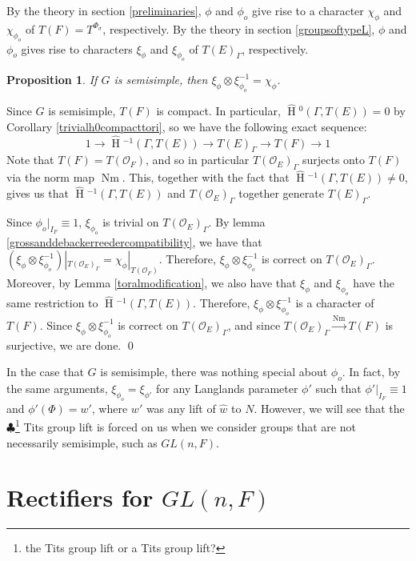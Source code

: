 \documentclass[11pt]{amsart}
\theoremstyle{plain}
\newtheorem{proposition}[theorem]{Proposition}
\newcommand{\MAxxx}[1]{$\clubsuit$\footnote{#1}}
\newcommand{\HT}[1]{\hat{\HH}{}^{#1}}
\theoremstyle{definition}
\DeclareMathOperator{\HH}{H}
\DeclareMathOperator{\Nm}{Nm}
\begin{document}
By the theory in section \ref{preliminaries}, $\phi$ and $\phi_o$ give
rise to a character $\chi_{\phi}$ and $\chi_{\phi_o}$ of
$T(F) = T^{\Phi_{\sigma}}$, respectively.  By the theory in section
\ref{groupsoftypeL}, $\phi$ and $\phi_o$ gives rise to characters
$\xi_{\phi}$ and $\xi_{\phi_o}$ of $T(E)_{\Gamma}$, respectively.

\begin{proposition}
If $G$ is semisimple, then $\xi_{\phi} \otimes \xi_{\phi_o}^{-1} = \chi_{\phi}$.
\end{proposition}

\proof
Since $G$ is semisimple, $T(F)$ is compact.  In particular,
$\HT{0}(\Gamma, T(E)) = 0$ by Corollary \ref{trivialh0compacttori},
so we have the following exact sequence:
$$1 \rightarrow \HT{-1}(\Gamma, T(E)) \rightarrow T(E)_{\Gamma} \rightarrow T(F) \rightarrow 1$$
Note that $T(F) = T(\mathcal{O}_F)$, and so in particular
$T(\mathcal{O}_E)_{\Gamma}$ surjects onto $T(F)$ via the norm map
$\Nm$.  This, together with the fact that $\HT{-1}(\Gamma, T(E)) \neq 0$,
gives us that $\HT{-1}(\Gamma,T(E))$ and
$T(\mathcal{O}_E)_{\Gamma}$ together generate $T(E)_{\Gamma}$.

Since $\phi_o|_{I_F} \equiv 1$, $\xi_{\phi_o}$ is trivial on
$T(\mathcal{O}_E)_{\Gamma}$.  By lemma
\ref{grossanddebackerreedercompatibility}, we have that
$(\xi_{\phi} \otimes \xi_{\phi_o}^{-1})|_{T(\mathcal{O}_E)_{\Gamma}} = \chi_{\phi}|_{T(\mathcal{O}_F)}$.
Therefore, $\xi_{\phi} \otimes \xi_{\phi_o}^{-1}$ is correct on
$T(\mathcal{O}_E)_{\Gamma}$.  Moreover, by Lemma
\ref{toralmodification}, we also have that $\xi_{\phi}$ and $\xi_{\phi_o}$ have
the same restriction to $\HT{-1}(\Gamma, T(E))$.  Therefore,
$\xi_{\phi} \otimes \xi_{\phi_o}^{-1}$ is a character of $T(F)$.  Since
$\xi_{\phi} \otimes \xi_{\phi_o}^{-1}$ is correct on $T(\mathcal{O}_E)_{\Gamma}$, and
since $T(\mathcal{O}_E)_{\Gamma} \xrightarrow{\Nm} T(F)$ is surjective,
we are done.
\qed

In the case that $G$ is semisimple, there was nothing special about
$\phi_o$.  In fact, by the same arguments, $\xi_{\phi_o} = \xi_{\phi'}$
for any Langlands parameter $\phi'$ such that $\phi'|_{I_F} \equiv 1$
and $\phi'(\Phi) = w'$, where $w'$ was any lift of $\hat{w}$ to $N$.
However, we will see that the \MAxxx{the Tits group lift or a Tits group
 lift?} Tits group lift is forced on us when we
consider groups that are not necessarily semisimple, such as $GL(n,F)$.

\section{Rectifiers for $GL(n,F)$}\label{GL(n)}
\end{document}
